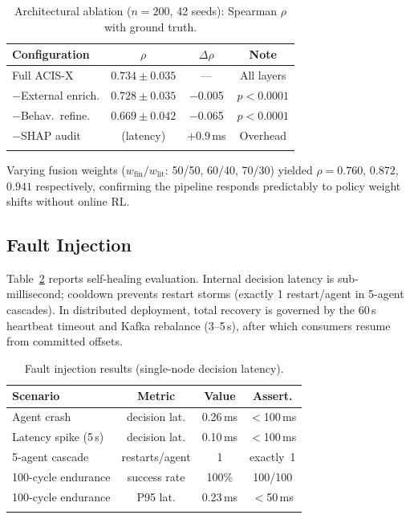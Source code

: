 \documentclass[pdflatex,sn-mathphys-num]{sn-jnl}
\theoremstyle{thmstyleone}
\theoremstyle{thmstyletwo}
\theoremstyle{thmstylethree}
\begin{document}
\begin{table}[htbp]
\caption{Architectural ablation ($n{=}200$, 42 seeds): Spearman $\rho$ with ground truth.}\label{tab:ablation}
\centering\footnotesize
\begin{tabular}{@{}lccc@{}}
\toprule
\textbf{Configuration} & \textbf{$\rho$} & \textbf{$\Delta\rho$} & \textbf{Note} \\
\midrule
Full ACIS-X            & $0.734 \pm 0.035$ & ---      & All layers \\
$-$External enrich.    & $0.728 \pm 0.035$ & $-$0.005 & $p{<}0.0001$ \\
$-$Behav.\ refine.     & $0.669 \pm 0.042$ & $-$0.065 & $p{<}0.0001$ \\
$-$SHAP audit          & (latency)         & $+$0.9\,ms & Overhead \\
\botrule
\end{tabular}
\end{table}

Varying fusion weights ($w_{\text{fin}}/w_{\text{lit}}$: 50/50, 60/40, 70/30) yielded $\rho{=}0.760$, $0.872$, $0.941$ respectively, confirming the pipeline responds predictably to policy weight shifts without online RL.

\subsection{Fault Injection}\label{subsec:fault}

Table~\ref{tab:fault} reports self-healing evaluation. Internal decision latency is sub-millisecond; cooldown prevents restart storms (exactly 1 restart/agent in 5-agent cascades). In distributed deployment, total recovery is governed by the 60\,s heartbeat timeout and Kafka rebalance (3--5\,s), after which consumers resume from committed offsets.

\begin{table}[htbp]
\caption{Fault injection results (single-node decision latency).}\label{tab:fault}
\centering\footnotesize
\begin{tabular}{@{}lccc@{}}
\toprule
\textbf{Scenario} & \textbf{Metric} & \textbf{Value} & \textbf{Assert.} \\
\midrule
Agent crash            & decision lat.  & 0.26\,ms & $<$100\,ms \\
Latency spike (5\,s)   & decision lat.  & 0.10\,ms & $<$100\,ms \\
5-agent cascade        & restarts/agent & 1        & exactly~1 \\
100-cycle endurance    & success rate   & 100\%    & 100/100 \\
100-cycle endurance    & P95 lat.       & 0.23\,ms & $<$50\,ms \\
\botrule
\end{tabular}
\end{table}
\end{document}
